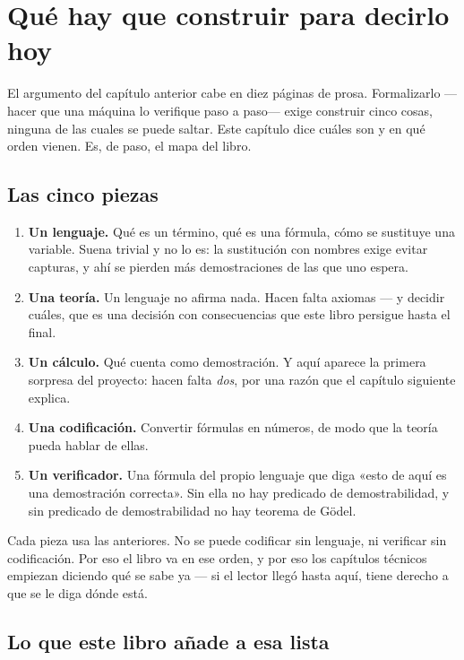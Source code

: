 \chapter{Qué hay que construir para decirlo hoy}
\label{cap:construir}

El argumento del capítulo anterior cabe en diez páginas de prosa. Formalizarlo —hacer que una
máquina lo verifique paso a paso— exige construir cinco cosas, ninguna de las cuales se puede
saltar. Este capítulo dice cuáles son y en qué orden vienen. Es, de paso, el mapa del libro.

\section{Las cinco piezas}

\begin{enumerate}[leftmargin=1.6em]
\item \textbf{Un lenguaje.} Qué es un término, qué es una fórmula, cómo se sustituye una variable.
  Suena trivial y no lo es: la sustitución con nombres exige evitar capturas, y ahí se pierden más
  demostraciones de las que uno espera.
\item \textbf{Una teoría.} Un lenguaje no afirma nada. Hacen falta axiomas — y decidir cuáles, que
  es una decisión con consecuencias que este libro persigue hasta el final.
\item \textbf{Un cálculo.} Qué cuenta como demostración. Y aquí aparece la primera sorpresa del
  proyecto: hacen falta \emph{dos}, por una razón que el capítulo siguiente explica.
\item \textbf{Una codificación.} Convertir fórmulas en números, de modo que la teoría pueda hablar
  de ellas.
\item \textbf{Un verificador.} Una fórmula del propio lenguaje que diga «esto de aquí es una
  demostración correcta». Sin ella no hay predicado de demostrabilidad, y sin predicado de
  demostrabilidad no hay teorema de Gödel.
\end{enumerate}

\begin{leccion}
Cada pieza usa las anteriores. No se puede codificar sin lenguaje, ni verificar sin codificación.
Por eso el libro va en ese orden, y por eso los capítulos técnicos empiezan diciendo qué se sabe ya
— si el lector llegó hasta aquí, tiene derecho a que se le diga dónde está.
\end{leccion}

\section{Lo que este libro añade a esa lista}

